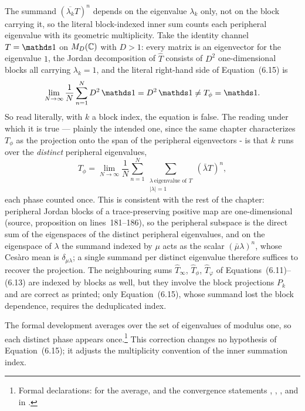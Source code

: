 \documentclass{article}
\begin{document}
The summand $(\overline{\lambda_k}T)^n$ depends on the eigenvalue $\lambda_k$
only, not on the block carrying it, so the literal block-indexed inner sum
counts each peripheral eigenvalue with its geometric multiplicity. Take the
identity channel $T=\one$ on $M_{D}(\mathbb{C})$ with $D>1$: every matrix is an eigenvector
for the eigenvalue $1$, the Jordan decomposition of $\widehat T$ consists of
$D^2$ one-dimensional blocks all carrying $\lambda_k=1$, and the literal
right-hand side of Equation~(6.15) is
\[
  \lim_{N\to\infty}\frac{1}{N}\sum_{n=1}^N D^2\,\one
  = D^2\,\one
  \neq T_\phi=\one.
\]
So read literally, with $k$ a block index, the equation is false. The reading
under which it is true --- plainly the intended one, since the same chapter
characterizes $T_\phi$ as the projection onto the span of the peripheral
eigenvectors - is that $k$ runs over the \emph{distinct} peripheral
eigenvalues,
\[
  T_\phi
  = \lim_{N\to\infty}\frac{1}{N}\sum_{n=1}^N
  \sum_{\substack{\lambda\ \text{eigenvalue of }T\\ |\lambda|=1}}
  (\bar\lambda T)^n ,
\]
each phase counted once. This is consistent with the rest of the chapter:
peripheral Jordan blocks of a trace-preserving positive map are
one-dimensional (source, proposition on lines~181--186), so the peripheral
subspace is the direct sum of the eigenspaces of the distinct peripheral
eigenvalues, and on the eigenspace of $\lambda$ the summand indexed by $\mu$
acts as the scalar $(\bar\mu\lambda)^n$, whose Ces\`aro mean is
$\delta_{\mu\lambda}$; a single summand per distinct eigenvalue therefore
suffices to recover the projection. The neighbouring sums
$\widehat T_\infty$, $\widehat T_\phi$, $\widehat T_\varphi$ of
Equations~(6.11)--(6.13) are indexed by blocks as well, but they involve the
block projections $P_k$ and are correct as printed; only Equation~(6.15),
whose summand lost the block dependence, requires the deduplicated index.

The formal development averages over the set of eigenvalues of modulus one, so
each distinct phase appears once.\footnote{Formal declarations:
   for the average, and the convergence
  statements
  ,
  ,
  ,
  and
  in .}
This correction changes no hypothesis of Equation~(6.15); it adjusts the
multiplicity convention of the inner summation index.
\end{document}
